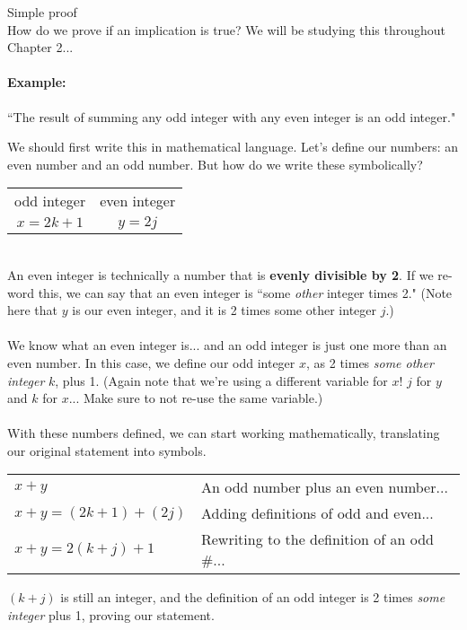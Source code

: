 \documentclass[a4paper,12pt]{book}
\begin{document}
        \begin{intro}{Simple proof} ~\\
            How do we prove if an implication is true? We will be studying
            this throughout Chapter 2...

            \paragraph{Example:}
            ``The result of summing any odd integer with any even integer is an odd integer."

            We should first write this in mathematical language. Let's define our numbers:
            an even number and an odd number. But how do we write these symbolically?

            \begin{center}
                \begin{tabular}{c c}
                    odd integer & even integer
                    \\
                    $x = 2k+1$ & $y = 2j$
                \end{tabular}
            \end{center}
            ~\\
            An even integer is technically a number that is \textbf{evenly divisible by 2}.
            If we re-word this, we can say that an even integer is ``some \textit{other} integer
            times 2." (Note here that $y$ is our even integer, and it is 2 times some other integer $j$.)
            ~\\~\\
            We know what an even integer is... and an odd integer is just one more than an even number.
            In this case, we define our odd integer $x$, as 2 times \textit{some other integer} $k$, plus 1.
            (Again note that we're using a different variable for $x$! $j$ for $y$ and $k$ for $x$...
            Make sure to not re-use the same variable.)
            ~\\~\\
            With these numbers defined, we can start working mathematically, translating our original
            statement into symbols.

            \begin{center}
                \begin{tabular}{l l}
                    $x + y$         &       An odd number plus an even number...
                    \\
                    $x + y = (2k+1) + (2j) $    &   Adding definitions of odd and even...
                    \\
                    $x + y = 2(k + j) + 1 $     &   Rewriting to the definition of an odd \#...
                \end{tabular}
            \end{center}

            $(k+j)$ is still an integer, and the definition of an odd integer
            is 2 times \textit{some integer} plus 1, proving our statement.

        \end{intro}
\end{document}
